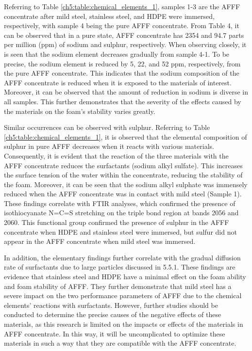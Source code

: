 Referring to Table \ref{ch5:table:chemical_elements_1}, samples 1-3 are the AFFF concentrate after mild steel, stainless steel, and HDPE were immersed, respectively, with sample 4 being the pure AFFF concentrate. From Table 4, it can be observed that in a pure state, AFFF concentrate has 2354 and 94.7 parts per million (ppm) of sodium and sulphur, respectively. When observing closely, it is seen that the sodium element decreases gradually from sample 4-1. To be precise, the sodium element is reduced by 5, 22, and 52 ppm, respectively, from the pure AFFF concentrate. This indicates that the sodium composition of the AFFF concentrate is reduced when it is exposed to the materials of interest. Moreover, it can be observed that the amount of reduction in sodium is diverse in all samples. This further demonstrates that the severity of the effects caused by the materials on the foam's stability varies greatly.

Similar occurrences can be observed with sulphur. Referring to Table \ref{ch5:table:chemical_elements_1}, it is observed that the elemental composition of sulphur in pure AFFF decreases when it reacts with various materials. Consequently, it is evident that the reaction of the three materials with the AFFF concentrate reduces the surfactants (sodium alkyl sulfate). This increases the surface tension of the water within the concentrate, reducing the stability of the foam. Moreover, it can be seen that the sodium alkyl sulphate was immensely reduced when the AFFF concentrate was in contact with mild steel (Sample 1). These findings correlate with FTIR analyses, which confirmed the presence of isothiocyanate N=C=S stretching on the triple bond region at bands 2056 and 2060. This functional group confirmed the presence of sulphur in the AFFF concentrate when HDPE and stainless steel were immersed, but sulfur did not appear in the AFFF concentrate when mild steel was immersed.

In addition, the elementary findings further correlate with the gradual diffusion rate of surfactants due to large particles discussed in 5.5.1. These findings are evidence that stainless steel and HDPE have a minimal effect on the foam ability and foam stability of AFFF. They further demonstrate that mild steel has a severe impact on the two performance parameters of AFFF due to the chemical elements' reactions with surfactants. However, further studies should be conducted to determine the precise causes of the negative effects of these materials, as this research is limited on the impacts or effects of the materials in AFFF concentrate. In this way, it will be uncomplicated to optimize these materials in such a way that they are compatible with the AFFF concentrate.

